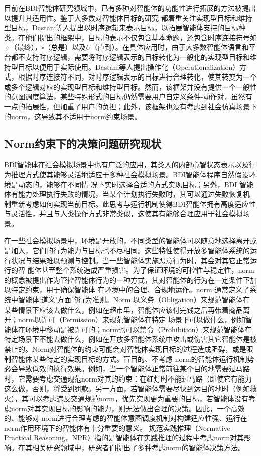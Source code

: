 目前在BDI智能体研究领域中，已有多种对智能体的功能性进行拓展的方法被提出以提升其适用性。鉴于大多数对智能体目标的研究 都着重关注实现型目标和维持型目标，Dastani等人\cite{DBLP:conf/atal/DastaniRW11}提出以时序逻辑来表示目标，以拓展智能体支持的目标种类。在他们提出的框架中，目标的表示不仅包含基本命题，还包含时序连接符号如$\diamond$（最终），$\square$（总是）以及$U$（直到）。在具体应用时，由于大多数智能体语言和平台都不支持时序逻辑，需要将时序逻辑表示的目标转化为一般化的实现型目标和维持型目标以便用于实际使用。Dastani等人提出操作化（Operationalization）方式，根据时序连接符不同，对时序逻辑表示的目标进行合理转化，使其转变为一个或多个逻辑对应的实现型目标和维持型目标。然而，该框架并没有提供一个一般性的意图调度算法，某些特殊形式的目标仍然需要用户自定义条件-动作对，虽然有一点的拓展性，但加重了用户的负担；此外，该框架也没有考虑到社会仿真场景下的norm，这导致其不适用于norm约束场景。
\subsection{Norm约束下的决策问题研究现状}
BDI智能体在社会模拟场景中也有广泛的应用\cite{DBLP:conf/ijcai/SinghSPJ11}，其类人的内部心智状态表示以及行为推理方式使其能够灵活地适应于多种社会模拟场景。BDI智能体程序自然假设环境是动态的，能够在不同情 况下实时选择合适的方式实现目标；另外，BDI 智能体有能力处理执行失败的情况，当某个计划执行失败时，其可以通过失败恢复机 制重新考虑如何实现当前目标。此思考与运行机制使得BDI智能体拥有高度适应性与灵活性，并且与人类操作方式非常类似，这使其有能够合理应用于社会模拟场景。

在一些社会模拟场景中，环境是开放的，不同类型的智能体可以随意地选择离开或是加入，它们的行为能力与目标也不尽相同。这些特性使得开放多智能体系统的运行状况与结果难以预测与控制。当一些智能体实施恶意行为时，其会对其它正常运行的智 能体甚至整个系统造成严重损害。为了保证环境的可控性与稳定性，norm的概念被提出作为管控智能体行为的一种方式\cite{DBLP:journals/mags/SavarimuthuC11}，其对智能体的行为在一定条件下加以特定约束，用于确保智能体 在环境中的合理、合规地运作。norm 通常定义了系统中智能体‘道义’方面的行为准则。Norm 以义务（Obligation）来规范智能体在 某些情景下应该去做什么，例如在超市里，智能体应该付完钱之后再带着商品离开；norm以许可（Permission）来规范智能体在特定 场景下可以做什么，例如智能体在环境中移动是被许可的；norm也可以禁令（Prohibition）来规范智能体在特定场景下不能去做什么，例如在开放多智能体系统中攻击或伤害其它智能体是被禁止的。Norm对智能体的约束可能会对智能体实现目标的过程造成阻碍，或是限制智能体某些特定的实现目标的方式。盲目的、不考虑 norm的智能体运行机制势必会导致低效的执行效果。例如，当一个智能体正常前往某个目的地需要过马路时，它需要考虑交通规范norm对其的约束：在红灯时不能过马路（即使它有能力这么做，否则，将受到罚款。另一方面，若智能体需要尽快到达目的地时（例如救火），其可以考虑违反交通规范norm，优先实现更为重要的目标，若智能体没有考虑norm对其实现目标的影响的能力，则无法做出合理的决策。因此，一个高效的、能够对 norm进行合理考虑的智能体意图调度机制对构建适应性强、运行在norm作用环境下的智能体有十分重要的意义。
规范实践推理（Normative Practical Reasoning，NPR）指的是智能体在实践推理的过程中考虑norm对其影响。在其相关研究领域中，研究者们提出了多种考虑norm的智能体决策方法。

